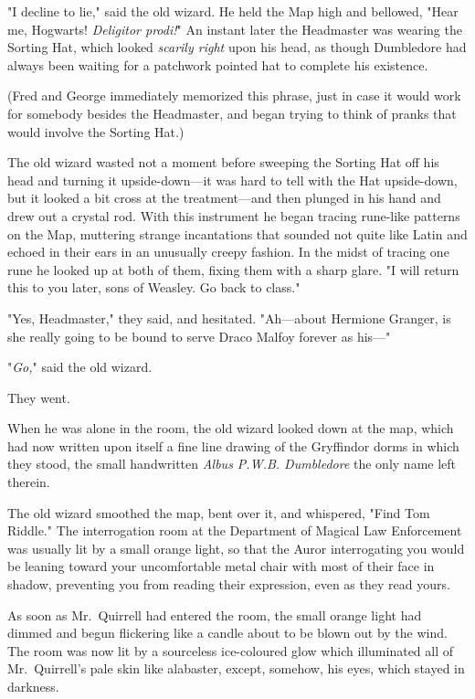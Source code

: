 "I decline to lie," said the old wizard. He held the Map high and bellowed,
"Hear me, Hogwarts! \emph{Deligitor prodi!}" An instant later the Headmaster
was wearing the Sorting Hat, which looked \emph{scarily right} upon his head,
as though Dumbledore had always been waiting for a patchwork pointed hat to
complete his existence.

(Fred and George immediately memorized this phrase, just in case it would work
for somebody besides the Headmaster, and began trying to think of pranks that
would involve the Sorting Hat.)

The old wizard wasted not a moment before sweeping the Sorting Hat off his head
and turning it upside-down---it was hard to tell with the Hat upside-down, but
it looked a bit cross at the treatment---and then plunged in his hand and drew
out a crystal rod. With this instrument he began tracing rune-like patterns on
the Map, muttering strange incantations that sounded not quite like Latin and
echoed in their ears in an unusually creepy fashion. In the midst of tracing
one rune he looked up at both of them, fixing them with a sharp glare. "I will
return this to you later, sons of Weasley. Go back to class."

"Yes, Headmaster," they said, and hesitated. "Ah---about Hermione Granger, is
she really going to be bound to serve Draco Malfoy forever as his---"

"\emph{Go,}" said the old wizard.

They went.

When he was alone in the room, the old wizard looked down at the map, which had
now written upon itself a fine line drawing of the Gryffindor dorms in which
they stood, the small handwritten \emph{Albus P.W.B. Dumbledore} the only name
left therein.

The old wizard smoothed the map, bent over it, and whispered, "Find Tom Riddle."
\later
The interrogation room at the Department of Magical Law Enforcement was usually
lit by a small orange light, so that the Auror interrogating you would be
leaning toward your uncomfortable metal chair with most of their face in
shadow, preventing you from reading their expression, even as they read yours.

As soon as Mr.~Quirrell had entered the room, the small orange light had dimmed
and begun flickering like a candle about to be blown out by the wind. The room
was now lit by a sourceless ice-coloured glow which illuminated all of
Mr.~Quirrell's pale skin like alabaster, except, somehow, his eyes, which
stayed in darkness.

